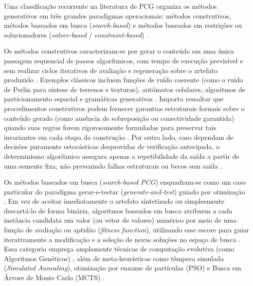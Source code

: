 Uma classificação recorrente na literatura de PCG organiza os métodos generativos em três grandes paradigmas operacionais: métodos construtivos, métodos baseados em busca (\textit{search-based}) e métodos baseados em restrições ou solucionadores (\textit{solver-based} / \textit{constraint-based}) \cite{togelius2011search, pcgbook, summerville2018procedural, maleki2024procedural}.

Os métodos construtivos caracterizam-se por gerar o conteúdo em uma única passagem sequencial de passos algorítmicos, com tempo de execução previsível e sem realizar ciclos iterativos de avaliação e regeneração sobre o artefato produzido \cite{shaker2016constructive, summerville2018procedural}. Exemplos clássicos incluem funções de ruído coerente (como o ruído de Perlin para síntese de terrenos e texturas), autômatos celulares, algoritmos de particionamento espacial e gramáticas generativas \cite{linden2014dungeons, shaker2016constructive, maleki2024procedural}. Importa ressaltar que procedimentos construtivos podem fornecer garantias estruturais formais sobre o conteúdo gerado (como ausência de sobreposição ou conectividade garantida) quando suas regras forem rigorosamente formuladas para preservar tais invariantes em cada etapa da construção \cite{shaker2016constructive}. Por outro lado, caso dependam de decisões puramente estocásticas desprovidas de verificação antecipada, o determinismo algorítmico assegura apenas a repetibilidade da saída a partir de uma semente fixa, não prevenindo falhas estruturais ou becos sem saída \cite{linden2014dungeons, shaker2016constructive}.

Os métodos baseados em busca (\textit{search-based PCG}) enquadram-se como um caso particular do paradigma gerar-e-testar (\textit{generate-and-test}) guiado por otimização \cite{togelius2011search, pcgbook, maleki2024procedural}. Em vez de aceitar imediatamente o artefato sintetizado ou simplesmente descartá-lo de forma binária, algoritmos baseados em busca atribuem a cada instância candidata um valor (ou vetor de valores) numérico por meio de uma função de avaliação ou aptidão (\textit{fitness function}), utilizando esse escore para guiar iterativamente a modificação e a seleção de novas soluções no espaço de busca \cite{togelius2011search, linden2014dungeons, araujo2018geracao, maleki2024procedural}. Essa categoria emprega amplamente técnicas de computação evolutiva (como Algoritmos Genéticos) \cite{togelius2011search, linden2014dungeons, maleki2024procedural}, além de meta-heurísticas como têmpera simulada (\textit{Simulated Annealing}), otimização por enxame de partículas (PSO) e Busca em Árvore de Monte Carlo (MCTS) \cite{maleki2024procedural}.

